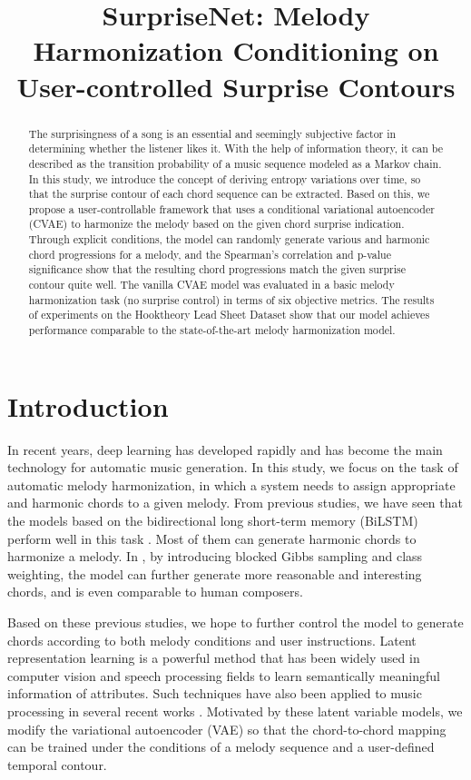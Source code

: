 \documentclass{article}
\title{SurpriseNet: Melody Harmonization Conditioning on User-controlled Surprise Contours}
\begin{document}
%
\maketitle
%
\begin{abstract}

The surprisingness of a song is an essential and seemingly subjective factor in determining whether the listener likes it. With the help of information theory, it can be described as the transition probability of a music sequence modeled as a Markov chain. In this study, we introduce the concept of deriving entropy variations over time, so that the surprise contour of each chord sequence can be extracted. Based on this, we propose a user-controllable framework that uses a conditional variational autoencoder (CVAE) to harmonize the melody based on the given chord surprise indication. Through explicit conditions, the model can randomly generate various and harmonic chord progressions for a melody, and the Spearman's correlation and p-value significance show that the resulting chord progressions match the given surprise contour quite well. The vanilla CVAE model was evaluated in a basic melody harmonization task (no surprise control) in terms of six objective metrics. The results of experiments on the Hooktheory Lead Sheet Dataset show that our model achieves performance comparable to the state-of-the-art melody harmonization model.
\end{abstract}

\section{Introduction}

In recent years, deep learning has developed rapidly and has become the main technology for automatic music generation. In this study, we focus on the task of automatic melody harmonization, in which a system needs to assign appropriate and harmonic chords to a given melody. From previous studies, we have seen that the models based on the bidirectional long short-term memory (BiLSTM) perform well in this task \cite{Lim2017,Yeh2020}. Most of them can generate harmonic chords to harmonize a melody. In \cite{Sun2020}, by introducing blocked Gibbs sampling and class weighting, the model can further generate more reasonable and interesting chords, and is even comparable to human composers.

Based on these previous studies, we hope to further control the model to generate chords according to both melody conditions and user instructions. Latent representation learning is a powerful method that has been widely used in computer vision \cite{Kim2018,Chen2016,Li2018} and speech processing fields \cite{Hsu2017,Wang2018} to learn semantically meaningful information of attributes. Such techniques have also been applied to music processing in several recent works \cite{Tan2020,Brunner2018,Wang2020}. Motivated by these latent variable models, we modify the variational autoencoder (VAE) \cite{Sohn2015} so that the chord-to-chord mapping can be trained under the conditions of a melody sequence and a user-defined temporal contour. 
\end{document}
